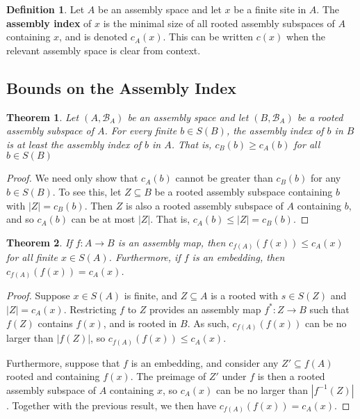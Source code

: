 \documentclass[aps,prd,onecolumn,nofootinbib,letterpaper,preprintnumbers,superscriptaddress,eqsecnum]{revtex4}
\newtheorem{theorem}{Theorem}
\theoremstyle{definition}
\newtheorem{definition}{Definition}
\newcommand{\B}{\mathcal{B}}
\begin{document}
\begin{definition}\label{def:index}
    Let $A$ be an assembly space and let $x$ be a finite site in $A$.
    The \textbf{assembly index} of $x$ is the minimal size of all rooted assembly subspaces of $A$ containing $x$, and is denoted $c_A(x)$.
    This can be written $c(x)$ when the relevant assembly space is clear from context.
\end{definition}

\subsection{Bounds on the Assembly Index}

\begin{theorem}\label{cor:subspace-index-upper-bound}
    Let $(A, \B_A)$ be an assembly space and let $(B, \B_A)$ be a rooted assembly subspace of $A$.
    For every finite $b \in S(B)$, the assembly index of $b$ in $B$ is at least the assembly index of $b$ in $A$.
    That is, $c_B(b) \ge c_A(b)$ for all $b \in S(B)$
\end{theorem}
\begin{proof}
    We need only show that $c_A(b)$ cannot be greater than $c_B(b)$ for any $b \in S(B)$.
    To see this, let $Z \subseteq B$ be a rooted assembly subspace containing $b$ with $|Z| = c_B(b)$.
    Then $Z$ is also a rooted assembly subspace of $A$ containing $b$, and so $c_A(b)$ can be at most $|Z|$.
    That is, $c_A(b) \le |Z| = c_B(b)$.
\end{proof}

\begin{theorem}\label{thm:image-lower-bound}
    If $f: A \rightarrow B$ is an assembly map, then $c_{f(A)}(f(x)) \le c_A(x)$ for all finite $x \in S(A)$.
    Furthermore, if $f$ is an embedding, then $c_{f(A)}(f(x)) = c_A(x)$.
\end{theorem}
\begin{proof}
    Suppose $x \in S(A)$ is finite, and $Z \subseteq A$ is a rooted with $s \in S(Z)$ and $|Z| = c_A(x)$.
    Restricting $f$ to $Z$ provides an assembly map $f^* : Z \rightarrow B$ such that $f(Z)$ contains $f(x)$, and is rooted in $B$.
    As such, $c_{f(A)}(f(x))$ can be no larger than $|f(Z)|$, so $c_{f(A)}(f(x)) \le c_A(x)$.

    Furthermore, suppose that $f$ is an embedding, and consider any $Z' \subseteq f(A)$ rooted and containing $f(x)$.
    The preimage of $Z'$ under $f$ is then a rooted assembly subspace of $A$ containing $x$, so $c_A(x)$ can be no larger than $|f^{-1}(Z)|$.
    Together with the previous result, we then have $c_{f(A)}(f(x)) = c_A(x)$.
\end{proof}
\end{document}
